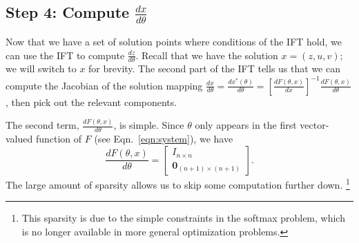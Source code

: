 \documentclass[11pt]{article}
\begin{document}
\subsection*{Step 4: Compute $\frac{dx}{d\theta}$}
Now that we have a set of solution points where conditions of the IFT hold,
we can use the IFT to compute $\frac{dz}{d\theta}$.
Recall that we have the solution $x = (z,u,v)$; we will switch to $x$ for brevity.
The second part of the IFT tells us that we can compute the Jacobian of the
solution mapping $\frac{dx}{d\theta} = \frac{dx^*(\theta)}{d\theta}
= \left[\frac{dF(\theta,x)}{dx}\right]^{-1}\frac{dF(\theta,x)}{d\theta}$,
then pick out the relevant components.

The second term, $\frac{dF(\theta,x)}{d\theta}$, is simple.
Since $\theta$ only appears in the first vector-valued function of $F$
(see Eqn.~\ref{eqn:system}), we have
\begin{equation}
\label{eqn:df-dtheta}
\frac{dF(\theta,x)}{d\theta} = \begin{bmatrix}
    I_{n\times n}\\
    \mathbf{0}_{(n+1)\times (n+1)}
\end{bmatrix}.
\end{equation}
The large amount of sparsity allows us to skip some computation further down.
\footnote{This sparsity is due to the simple constraints in the softmax problem,
which is no longer available in more general optimization problems.}
\end{document}
